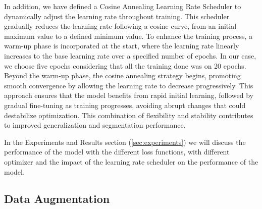 \documentclass[10pt,twocolumn,letterpaper]{article}
\begin{document}
In addition, we have defined a Cosine Annealing Learning Rate Scheduler to dynamically adjust the learning rate throughout training. This scheduler gradually reduces the learning rate following a cosine curve, from an initial maximum value to a defined minimum value. To enhance the training process, a warm-up phase is incorporated at the start, where the learning rate linearly increases to the base learning rate over a specified number of epochs. In our case, we choose five epochs considering that all the training done was on 20 epochs. Beyond the warm-up phase, the cosine annealing strategy begins, promoting smooth convergence by allowing the learning rate to decrease progressively. This approach ensures that the model benefits from rapid initial learning, followed by gradual fine-tuning as training progresses, avoiding abrupt changes that could destabilize optimization. This combination of flexibility and stability contributes to improved generalization and segmentation performance.

In the Experiments and Results section (\ref{sec:experiments}) we will discuss the performance of the model with the different loss functions, with different optimizer and the impact of the learning rate scheduler on the performance of the model. 

\subsection{Data Augmentation}
\end{document}
